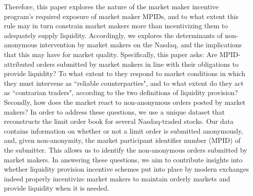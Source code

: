 \documentclass{article}
\begin{document}
\noindent Therefore, this paper explores the nature of the market maker incentive program's required exposure of market maker MPIDs, and to what extent this rule may in turn constrain market makers more than incentivizing them to adequately supply liquidity. Accordingly, we explores the determinants of non-anonymous intervention by market makers on the Nasdaq, and the implications that this may have for market quality. Specifically, this paper asks: Are MPID-attributed orders submitted by market makers in line with their obligations to provide liquidity? To what extent to they respond to market conditions in which they must intervene as ``reliable counterparties", and to what extent do they act as ``contrarian traders", according to the two definitions of liquidity provision? Secondly, how does the market react to non-anonymous orders posted by market makers? In order to address these questions, we use a unique dataset that reconstructs the limit order book for several Nasdaq-traded stocks. Our data contains information on whether or not a limit order is submitted anonymously, and, given non-anonymity, the market participant identifier number (MPID) of the submitter. This allows us to identify the non-anonymous orders submitted by market makers. In answering these questions, we aim to contribute insights into whether liquidity provision incentive schemes put into place by modern exchanges indeed properly incentivize market makers to maintain orderly markets and provide liquidity when it is needed.
\end{document}
